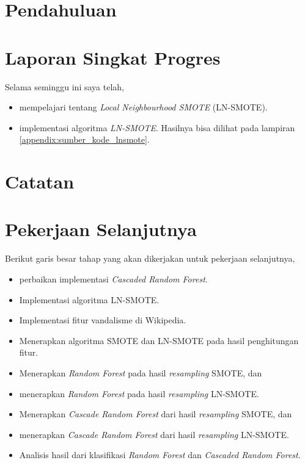 






\section{Pendahuluan}

\section{Laporan Singkat Progres}

Selama seminggu ini saya telah,
\begin{itemize}
\item mempelajari tentang \textit{Local Neighbourhood SMOTE} (LN-SMOTE).
\item implementasi algoritma \textit{LN-SMOTE}. Hasilnya bisa dilihat pada
lampiran \ref{appendix:sumber_kode_lnsmote}.
\end{itemize}

\section{Catatan}



\clearpage
\section{Pekerjaan Selanjutnya}

Berikut garis besar tahap yang akan dikerjakan untuk pekerjaan selanjutnya,

\begin{itemize}
\item perbaikan implementasi \textit{Cascaded Random Forest}.
\item Implementasi algoritma LN-SMOTE.
\item Implementasi fitur vandalisme di Wikipedia.
\item Menerapkan algoritma SMOTE dan LN-SMOTE pada hasil penghitungan fitur.
\item Menerapkan \textit{Random Forest} pada hasil \textit{resampling} SMOTE,
dan
\item menerapkan \textit{Random Forest} pada hasil \textit{resampling} LN-SMOTE.
\item Menerapkan \textit{Cascade Random Forest} dari hasil \textit{resampling}
SMOTE, dan
\item menerapkan \textit{Cascade Random Forest} dari hasil \textit{resampling}
LN-SMOTE.
\item Analisis hasil dari klasifikasi \textit{Random Forest} dan
\textit{Cascaded Random Forest}.
\end{itemize}

\clearpage
{}

\advisorsignature

\clearpage
{}
\printbibliography

\newpage
\appendix



